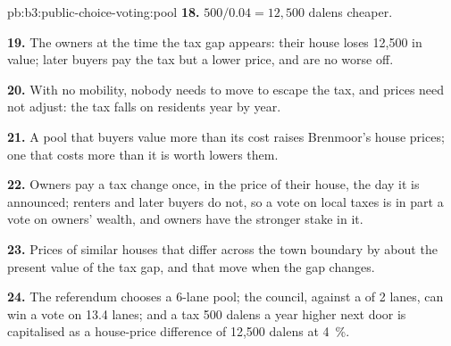 \begin{solution}{pb:b3:public-choice-voting:pool}
\textbf{18.} $500/0.04 = 12{,}500$ dalens cheaper.

\textbf{19.} The owners at the time the tax gap appears: their house loses 12{,}500 in value;
later buyers pay the tax but a lower price, and are no worse off.

\textbf{20.} With no mobility, nobody needs to move to escape the tax, and prices need
not adjust: the tax falls on residents year by year.

\textbf{21.} A pool that buyers value more than its cost raises Brenmoor's house prices;
one that costs more than it is worth lowers them.

\textbf{22.} Owners pay a tax change once, in the price of their house, the day it is
announced; renters and later buyers do not, so a vote on local taxes is in part a
vote on owners' wealth, and owners have the stronger stake in it.

\textbf{23.} Prices of similar houses that differ across the town boundary by about the
present value of the tax gap, and that move when the gap changes.

\textbf{24.} The referendum chooses a 6-lane pool; the council, against a  of 2
lanes, can win a vote on 13.4 lanes; and a tax 500 dalens a year higher next door is
capitalised as a house-price difference of 12{,}500 dalens at 4~\%.
\end{solution}
